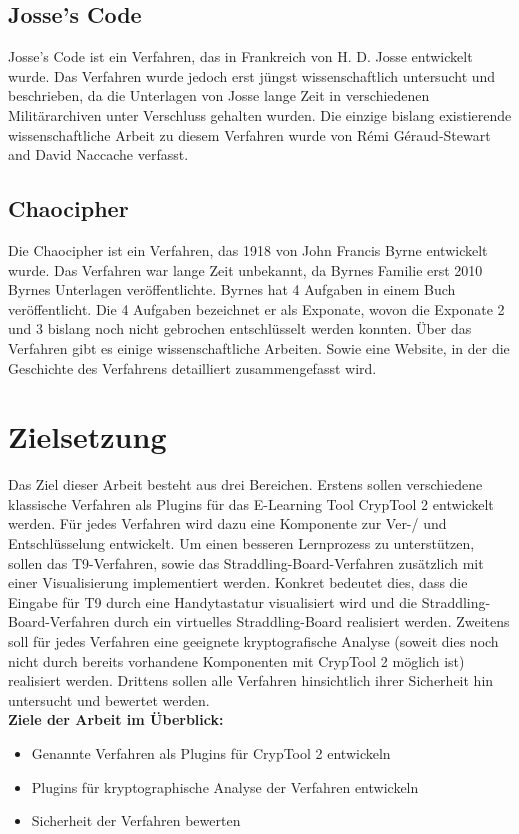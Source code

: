 \documentclass[fontsize=11pt, paper=a4, parskip=half]{scrartcl}
\begin{document}
\subsection{Josse's Code}
Josse's Code ist ein Verfahren, das in Frankreich von H. D. Josse entwickelt wurde. Das Verfahren wurde jedoch erst jüngst wissenschaftlich untersucht und beschrieben, da die Unterlagen von Josse lange Zeit in verschiedenen Militärarchiven unter Verschluss gehalten wurden. Die einzige bislang existierende wissenschaftliche Arbeit zu diesem Verfahren wurde von Rémi Géraud-Stewart and David Naccache verfasst. \cite{GeraudStewart2020AFrenchCipherFromTheLate19thCentury}
\subsection{Chaocipher}
Die Chaocipher ist ein Verfahren, das 1918 von John Francis Byrne entwickelt wurde. Das Verfahren war lange Zeit unbekannt, da Byrnes Familie erst 2010 Byrnes Unterlagen veröffentlichte. Byrnes hat 4 Aufgaben in einem Buch veröffentlicht. Die 4 Aufgaben bezeichnet er als Exponate, wovon die Exponate 2 und 3 bislang noch nicht gebrochen entschlüsselt werden konnten.\cite{Cowan2010CHAOCIPHERSOLVINGEXHIBITS1and4} \cite{scheffler2010Chaocipher} Über das Verfahren gibt es einige wissenschaftliche Arbeiten. \cite{Rubin2011JohnFByrnesChaocipherRevealed} \cite{Hill2009CHAOCIPHERANALYSISANDMODELS}
 \cite{Rubin2010CHAOCIPHERREVEALEDTHEALGORITHM}
Sowie eine Website, in der die Geschichte des Verfahrens detailliert zusammengefasst wird.
 \cite{Rubin2020TheChaocipherClearingHouse}   
\section{Zielsetzung}
Das Ziel dieser Arbeit besteht aus drei Bereichen. Erstens sollen verschiedene klassische Verfahren als Plugins für das E-Learning Tool CrypTool 2 entwickelt werden. Für jedes Verfahren wird dazu eine Komponente zur Ver-/ und Entschlüsselung entwickelt. Um einen besseren Lernprozess zu unterstützen, sollen das T9-Verfahren, sowie das Straddling-Board-Verfahren zusätzlich mit einer Visualisierung implementiert werden. Konkret bedeutet dies, dass die Eingabe für T9 durch eine Handytastatur visualisiert wird und die Straddling-Board-Verfahren durch ein virtuelles Straddling-Board realisiert werden. Zweitens soll für jedes Verfahren eine geeignete kryptografische Analyse (soweit dies noch nicht durch bereits vorhandene Komponenten mit CrypTool 2 möglich ist) realisiert werden. Drittens sollen alle Verfahren hinsichtlich ihrer Sicherheit hin untersucht und bewertet werden.\\
\linebreak
\textbf{Ziele der Arbeit im Überblick:}
\begin{itemize}
	\item{Genannte Verfahren als Plugins für CrypTool 2 entwickeln}
	\item{Plugins für kryptographische Analyse der Verfahren entwickeln}
	\item{Sicherheit der Verfahren bewerten}	
\end{itemize}
\end{document}
